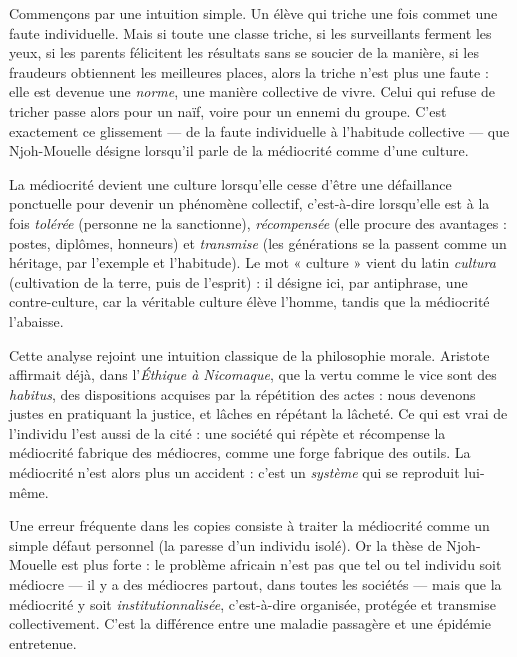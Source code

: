 \documentclass[11pt]{article}
\newcommand{\cle}[1]{{\popxbold\color{popdark}#1}}
\begin{document}
Commençons par une intuition simple. Un élève qui triche une fois commet une faute individuelle. Mais si toute une classe triche, si les surveillants ferment les yeux, si les parents félicitent les résultats sans se soucier de la manière, si les fraudeurs obtiennent les meilleures places, alors la triche n'est plus une faute : elle est devenue une \emph{norme}, une manière collective de vivre. Celui qui refuse de tricher passe alors pour un naïf, voire pour un ennemi du groupe. C'est exactement ce glissement — de la faute individuelle à l'habitude collective — que Njoh-Mouelle désigne lorsqu'il parle de la médiocrité comme d'une \cle{culture}.

\begin{definition}
La médiocrité devient une \cle{culture} lorsqu'elle cesse d'être une défaillance ponctuelle pour devenir un phénomène collectif, c'est-à-dire lorsqu'elle est à la fois \emph{tolérée} (personne ne la sanctionne), \emph{récompensée} (elle procure des avantages : postes, diplômes, honneurs) et \emph{transmise} (les générations se la passent comme un héritage, par l'exemple et l'habitude). Le mot « culture » vient du latin \emph{cultura} (cultivation de la terre, puis de l'esprit) : il désigne ici, par antiphrase, une contre-culture, car la véritable culture élève l'homme, tandis que la médiocrité l'abaisse.
\end{definition}

Cette analyse rejoint une intuition classique de la philosophie morale. Aristote affirmait déjà, dans l'\emph{Éthique à Nicomaque}, que la vertu comme le vice sont des \emph{habitus}, des dispositions acquises par la répétition des actes : nous devenons justes en pratiquant la justice, et lâches en répétant la lâcheté. Ce qui est vrai de l'individu l'est aussi de la cité : une société qui répète et récompense la médiocrité fabrique des médiocres, comme une forge fabrique des outils. La médiocrité n'est alors plus un accident : c'est un \emph{système} qui se reproduit lui-même.

\begin{attention}
Une erreur fréquente dans les copies consiste à traiter la médiocrité comme un simple défaut personnel (la paresse d'un individu isolé). Or la thèse de Njoh-Mouelle est plus forte : le problème africain n'est pas que tel ou tel individu soit médiocre — il y a des médiocres partout, dans toutes les sociétés — mais que la médiocrité y soit \emph{institutionnalisée}, c'est-à-dire organisée, protégée et transmise collectivement. C'est la différence entre une maladie passagère et une épidémie entretenue.
\end{attention}
\end{document}
